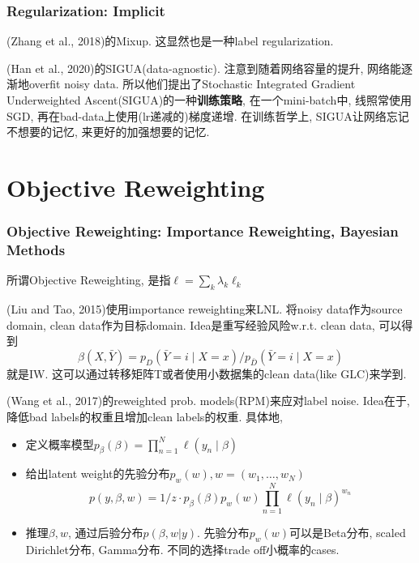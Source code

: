 \documentclass{beamer}
\newcommand{\bt}[1]{\textbf{#1}}
\begin{document}
\begin{frame}
    \frametitle{Regularization: Implicit}

    (Zhang et al., 2018)的Mixup. 这显然也是一种label regularization.

    (Han et al., 2020)的SIGUA(data-agnostic). 注意到随着网络容量的提升, 网络能逐渐地overfit noisy data. 所以他们提出了Stochastic Integrated Gradient Underweighted Ascent(SIGUA)的一种\bt{训练策略}, 在一个mini-batch中, 线照常使用SGD, 再在bad-data上使用(lr递减的)梯度递增. 在训练哲学上, SIGUA让网络忘记不想要的记忆, 来更好的加强想要的记忆.

\end{frame}

\section{Objective Reweighting}

\begin{frame}
    \frametitle{Objective Reweighting: Importance Reweighting, Bayesian Methods}

    所谓Objective Reweighting, 是指$\ell=\sum_k \lambda_k \ell_k$

    (Liu and Tao, 2015)使用importance reweighting来LNL. 将noisy data作为source domain, clean data作为目标domain. Idea是重写经验风险w.r.t. clean data, 可以得到
    \begin{equation}
        \beta(X,\bar Y)=p_{D}(\bar{Y}=i \mid X=x) / p_{\bar{D}}(\bar{Y}=i \mid X=x)
    \end{equation}
    就是IW. 这可以通过转移矩阵T或者使用小数据集的clean data(like GLC)来学到.

    (Wang et al., 2017)的reweighted prob. models(RPM)来应对label noise. Idea在于, 降低bad labels的权重且增加clean labels的权重. 具体地,
    \begin{itemize}
        \item 定义概率模型$p_{\beta}(\beta)=\prod_{n=1}^{N} \ell\left(y_{n} \mid \beta\right)$
        \item 给出latent weight的先验分布$p_w(w), w=(w_1,\dots, w_N)$
        \begin{equation}
            p(y, \beta, w)=1 / z \cdot p_{\beta}(\beta) p_{w}(w) \prod_{n=1}^{N} \ell\left(y_{n} \mid \beta\right)^{w_{n}}
        \end{equation}
        \item 推理$\beta, w$, 通过后验分布$p(\beta, w| y)$. 先验分布$p_w(w)$可以是Beta分布, scaled Dirichlet分布, Gamma分布. 不同的选择trade off小概率的cases.
    \end{itemize}

\end{frame}
\end{document}
